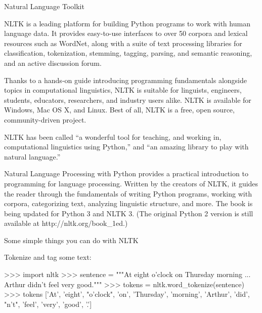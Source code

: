 Natural Language Toolkit

NLTK is a leading platform for building Python programs to work with human language data. It provides easy-to-use interfaces to over 50 corpora and lexical resources such as WordNet, along with a suite of text processing libraries for classification, tokenization, stemming, tagging, parsing, and semantic reasoning, and an active discussion forum.

Thanks to a hands-on guide introducing programming fundamentals alongside topics in computational linguistics, NLTK is suitable for linguists, engineers, students, educators, researchers, and industry users alike. NLTK is available for Windows, Mac OS X, and Linux. Best of all, NLTK is a free, open source, community-driven project.

NLTK has been called “a wonderful tool for teaching, and working in, computational linguistics using Python,” and “an amazing library to play with natural language.”

Natural Language Processing with Python provides a practical introduction to programming for language processing. Written by the creators of NLTK, it guides the reader through the fundamentals of writing Python programs, working with corpora, categorizing text, analyzing linguistic structure, and more. The book is being updated for Python 3 and NLTK 3. (The original Python 2 version is still available at http://nltk.org/book_1ed.)




Some simple things you can do with NLTK

Tokenize and tag some text:

>>> import nltk
>>> sentence = """At eight o'clock on Thursday morning
... Arthur didn't feel very good."""
>>> tokens = nltk.word_tokenize(sentence)
>>> tokens
['At', 'eight', "o'clock", 'on', 'Thursday', 'morning',
'Arthur', 'did', "n't", 'feel', 'very', 'good', '.']
